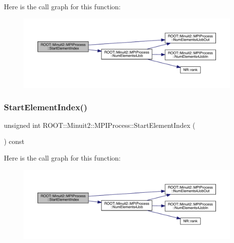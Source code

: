 Here is the call graph for this function\+:
\nopagebreak
\begin{figure}[H]
\begin{center}
\leavevmode
\includegraphics[width=350pt]{dc/d43/classROOT_1_1Minuit2_1_1MPIProcess_a9e6b2dc6f57cc91bb11637b50ba15957_cgraph}
\end{center}
\end{figure}
\mbox{\label{classROOT_1_1Minuit2_1_1MPIProcess_a9e6b2dc6f57cc91bb11637b50ba15957}} 
\subsubsection{\texorpdfstring{StartElementIndex()}{StartElementIndex()}\hspace{0.1cm}{\footnotesize\ttfamily [3/3]}}
{\footnotesize\ttfamily unsigned int R\+O\+O\+T\+::\+Minuit2\+::\+M\+P\+I\+Process\+::\+Start\+Element\+Index (\begin{DoxyParamCaption}{ }\end{DoxyParamCaption}) const\hspace{0.3cm}{\ttfamily [inline]}}

Here is the call graph for this function\+:
\nopagebreak
\begin{figure}[H]
\begin{center}
\leavevmode
\includegraphics[width=350pt]{dc/d43/classROOT_1_1Minuit2_1_1MPIProcess_a9e6b2dc6f57cc91bb11637b50ba15957_cgraph}
\end{center}
\end{figure}
\mbox{\label{classROOT_1_1Minuit2_1_1MPIProcess_a235146d3dbd688de458e09425e546d96}} 
